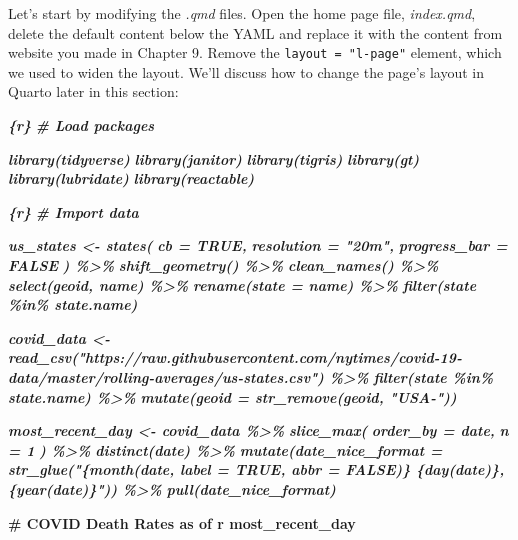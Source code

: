 \documentclass[
]{book}
\newenvironment{Shaded}{\begin{snugshade}}{\end{snugshade}}
\newcommand{\FunctionTok}[1]{\textcolor[rgb]{0.13,0.29,0.53}{\textbf{#1}}}
\newcommand{\InformationTok}[1]{\textcolor[rgb]{0.56,0.35,0.01}{\textbf{\textit{#1}}}}
\begin{document}
Let's start by modifying the \emph{.qmd} files. Open the home page file, \emph{index.qmd}, delete the default content below the YAML and replace it with the content from website you made in Chapter 9. Remove the \texttt{layout\ =\ "l-page"} element, which we used to widen the layout. We'll discuss how to change the page's layout in Quarto later in this section:

\begin{Shaded}
\begin{Highlighting}[]
\InformationTok{\textasciigrave{}\textasciigrave{}\textasciigrave{}\{r\}}
\InformationTok{\# Load packages}

\InformationTok{library(tidyverse)}
\InformationTok{library(janitor)}
\InformationTok{library(tigris)}
\InformationTok{library(gt)}
\InformationTok{library(lubridate)}
\InformationTok{library(reactable)}
\InformationTok{\textasciigrave{}\textasciigrave{}\textasciigrave{}}

\InformationTok{\textasciigrave{}\textasciigrave{}\textasciigrave{}\{r\}}
\InformationTok{\# Import data}

\InformationTok{us\_states \textless{}{-} states(}
\InformationTok{  cb = TRUE,}
\InformationTok{  resolution = "20m",}
\InformationTok{  progress\_bar = FALSE}
\InformationTok{) \%\textgreater{}\%}
\InformationTok{  shift\_geometry() \%\textgreater{}\%}
\InformationTok{  clean\_names() \%\textgreater{}\%}
\InformationTok{  select(geoid, name) \%\textgreater{}\%}
\InformationTok{  rename(state = name) \%\textgreater{}\%}
\InformationTok{  filter(state \%in\% state.name)}

\InformationTok{covid\_data \textless{}{-} read\_csv("https://raw.githubusercontent.com/nytimes/covid{-}19{-}data/master/rolling{-}averages/us{-}states.csv") \%\textgreater{}\%}
\InformationTok{  filter(state \%in\% state.name) \%\textgreater{}\%}
\InformationTok{  mutate(geoid = str\_remove(geoid, "USA{-}"))}

\InformationTok{most\_recent\_day \textless{}{-} covid\_data \%\textgreater{}\%}
\InformationTok{  slice\_max(}
\InformationTok{    order\_by = date,}
\InformationTok{    n = 1}
\InformationTok{  ) \%\textgreater{}\%}
\InformationTok{  distinct(date) \%\textgreater{}\%}
\InformationTok{  mutate(date\_nice\_format = str\_glue("\{month(date, label = TRUE, abbr = FALSE)\} \{day(date)\}, \{year(date)\}")) \%\textgreater{}\%}
\InformationTok{  pull(date\_nice\_format)}
\InformationTok{\textasciigrave{}\textasciigrave{}\textasciigrave{}}

\FunctionTok{\# COVID Death Rates as of \textasciigrave{}r most\_recent\_day\textasciigrave{}}


\end{Highlighting}
\end{Shaded}
\end{document}
